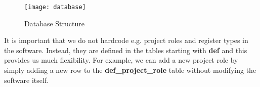 \begin{figure}[htb]
\centering
\texttt{[image: database]}
\caption{Database Structure\label{fig:Database Structure}}
\end{figure}

It is important that we do not hardcode e.g. project roles and register types in the software. Instead, they are defined in the tables starting with \textbf{def} and this provides us much flexibility. For example, we can add a new project role by simply adding a new row to the \textbf{def\_project\_role} table without modifying the software itself.